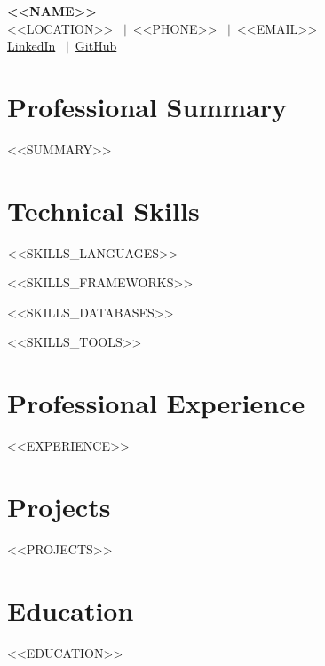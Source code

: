\documentclass[10pt,a4paper]{article}
\begin{document}
\begin{center}
    {\Huge \bfseries <<NAME>>} \\ \vspace{2pt}
    <<LOCATION>> \ $|$\ <<PHONE>> \ $|$\ \href{mailto:<<EMAIL>>}{<<EMAIL>>} \\ \vspace{2pt}
    \href{<<LINKEDIN>>}{LinkedIn} \ $|$\ \href{<<GITHUB>>}{GitHub}
\end{center}

\vspace{-4pt}
\section*{Professional Summary}
<<SUMMARY>>

\section*{Technical Skills}
\begin{description}[labelwidth=120pt, leftmargin=125pt, style=nextline, nosep]
    \item[\textbf{Programming Languages:}] <<SKILLS_LANGUAGES>>
    \item[\textbf{Frameworks \& Libraries:}] <<SKILLS_FRAMEWORKS>>
    \item[\textbf{Databases:}] <<SKILLS_DATABASES>>
    \item[\textbf{Tools \& DevOps:}] <<SKILLS_TOOLS>>
\end{description}

\section*{Professional Experience}
\vspace{-4pt}
<<EXPERIENCE>>

\vspace{-6pt}
\section*{Projects}
<<PROJECTS>>

\vspace{-6pt}
\section*{Education}
<<EDUCATION>>
\end{document}
